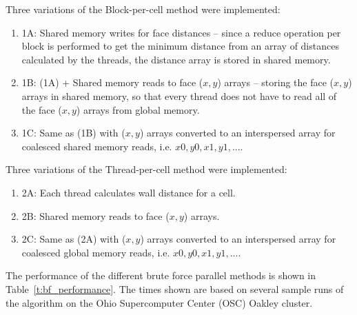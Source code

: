 \documentclass[]{aiaa-tc}%
\begin{document}
Three variations of the Block-per-cell method were implemented:

\begin{enumerate}

  \item 1A: Shared memory writes for face distances – since a
    reduce operation per block is performed to get the minimum
    distance from an array of distances calculated by the threads, the
    distance array is stored in shared memory.

  \item 1B: (1A) + Shared memory reads to face ($x, y$) arrays – storing
    the face ($x, y$) arrays in shared memory, so that every thread does
    not have to read all of the face ($x, y$) arrays from global memory.

  \item 1C: Same as (1B) with ($x, y$) arrays converted to an
    interspersed array for coalesced shared memory reads, i.e. $x0, y0,
    x1, y1, ....$

\end{enumerate}


Three variations of the Thread-per-cell method were implemented:

\begin{enumerate}
  
\item 2A: Each thread calculates wall distance for a cell.
  
\item 2B: Shared memory reads to face ($x, y$) arrays.
  
\item 2C: Same as (2A) with ($x, y$) arrays converted to an
  interspersed array for coalesced global memory reads, i.e. $x0, y0,
  x1, y1, ....$
  
\end{enumerate}


The performance of the different brute force parallel methods is shown
in Table~\ref{t:bf_performance}.  The times shown are based on several sample runs of the
algorithm on the Ohio Supercomputer Center (OSC) Oakley cluster. 
\end{document}
